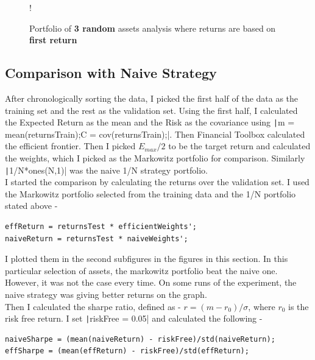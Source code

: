 \documentclass[11pt]{article}
\begin{document}
\begin{figure}[!h]
   \centering 
 	\resizebox {\textwidth} {!} { }
    \caption{Portfolio of \textbf{3 random} assets analysis where returns are based on \textbf{first return}}
	\label{fig:q2-all-based-on-first}
	\vspace{-0.5cm}
\end{figure}

\subsection{Comparison with Naive Strategy}

After chronologically sorting the data, I picked the first half of the data as the training set and the
rest as the validation set. Using the first half, I calculated the Expected Return as the mean and the
Risk as the covariance using \texttt|m = mean(returnsTrain);C = cov(returnsTrain);|. Then
Financial Toolbox calculated the efficient frontier. Then I picked $E_{max}/2$ to be the target return 
and calculated the weights, which I picked as the Markowitz portfolio for comparison. Similarly 
\texttt|1/N*ones(N,1)| was the naive 1/N strategy portfolio.\\

I started the comparison by calculating the returns over the validation set. I used the Markowitz
portfolio selected from the training data and the 1/N portfolio stated above -

\begin{verbatim}
effReturn = returnsTest * efficientWeights';
naiveReturn = returnsTest * naiveWeights';
\end{verbatim}

I plotted them in the second subfigures in the figures in this section. In this particular
selection of assets, the markowitz portfolio beat the naive one. However, it was not the case every time.
On some runs of the experiment, the naive strategy was giving better returns on the graph.\\

Then I calculated the sharpe ratio, defined as - $r = (m - r_0)/\sigma$, where $r_0$ is the risk free return.
I set \texttt|riskFree = 0.05| and calculated the following -

\begin{verbatim}
naiveSharpe = (mean(naiveReturn) - riskFree)/std(naiveReturn);
effSharpe = (mean(effReturn) - riskFree)/std(effReturn);
\end{verbatim}
\end{document}
